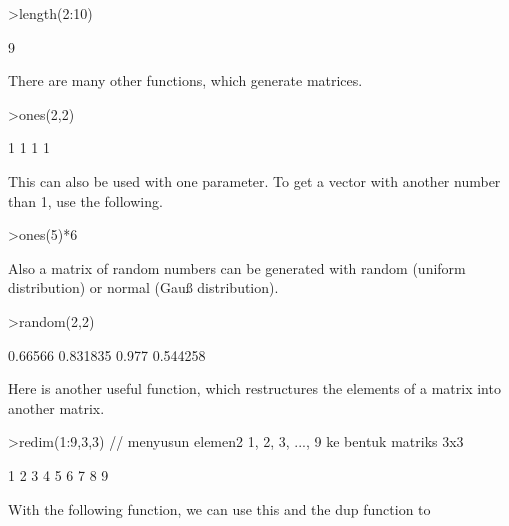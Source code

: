 \documentclass{article}
\begin{document}
\begin{eulernotebook}
\begin{eulercomment}
\begin{eulercomment}
\begin{eulercomment}
\begin{eulercomment}
\begin{eulercomment}
\begin{eulercomment}
\begin{eulercomment}
\end{eulercomment}
\begin{eulerprompt}
>length(2:10)
\end{eulerprompt}
\begin{euleroutput}
  9
\end{euleroutput}
\begin{eulercomment}
There are many other functions, which generate matrices.
\end{eulercomment}
\begin{eulerprompt}
>ones(2,2)
\end{eulerprompt}
\begin{euleroutput}
              1             1 
              1             1 
\end{euleroutput}
\begin{eulercomment}
This can also be used with one parameter. To get a vector with another
number than 1, use the following.
\end{eulercomment}
\begin{eulerprompt}
>ones(5)*6
\end{eulerprompt}
\begin{euleroutput}
  [6,  6,  6,  6,  6]
\end{euleroutput}
\begin{eulercomment}
Also a matrix of random numbers can be generated with random (uniform
distribution) or normal (Gauß distribution).
\end{eulercomment}
\begin{eulerprompt}
>random(2,2)
\end{eulerprompt}
\begin{euleroutput}
        0.66566      0.831835 
          0.977      0.544258 
\end{euleroutput}
\begin{eulercomment}
Here is another useful function, which restructures the elements of a
matrix into another matrix.
\end{eulercomment}
\begin{eulerprompt}
>redim(1:9,3,3) // menyusun elemen2 1, 2, 3, ..., 9 ke bentuk matriks 3x3
\end{eulerprompt}
\begin{euleroutput}
              1             2             3 
              4             5             6 
              7             8             9 
\end{euleroutput}
\begin{eulercomment}
With the following function, we can use this and the dup function to

\end{eulercomment}
\end{eulercomment}
\end{eulercomment}
\end{eulercomment}
\end{eulercomment}
\end{eulercomment}
\end{eulercomment}
\end{eulernotebook}
\end{document}
